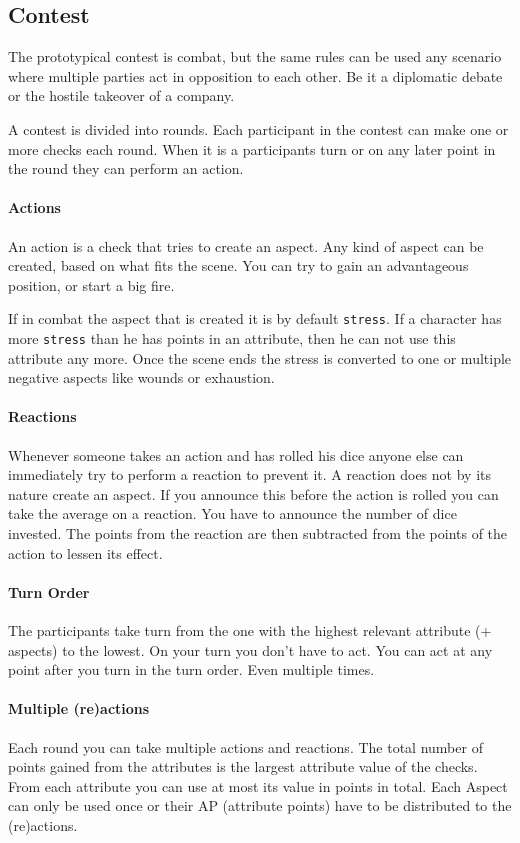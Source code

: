 \documentclass[11pt]{article}
\begin{document}
{\subsection{Contest}
\label{sec:org1925a87}
The prototypical contest is combat, but the same rules can be used any scenario where multiple parties act in opposition to each other. Be it a diplomatic debate or the hostile takeover of a company. 

A contest is divided into rounds. Each participant in the contest can make one or more checks each round. When it is a participants turn or on any later point in the round they can perform an action.

\paragraph*{Actions}
\label{sec:orgf84fa0a}
An action is a check that tries to create an aspect. Any kind of aspect can be created, based on what fits the scene. You can try to gain an advantageous position, or start a big fire.

If in combat the aspect that is created it is by default \texttt{stress}. If a character has more \texttt{stress} than he has points in an attribute, then  he can not use this attribute any more. Once the scene ends the stress is converted to one or multiple negative aspects like wounds or exhaustion. 

\paragraph*{Reactions}
\label{sec:org823c367}
Whenever someone takes an action and has rolled his dice anyone else can immediately try to perform a reaction to prevent it. A reaction does not by its nature create an aspect. If you announce this before the action is rolled you can take the average on a reaction. You have to announce the number of dice invested. The points from the reaction are then subtracted from the points of the action to lessen its effect.

\paragraph*{Turn Order}
\label{sec:orgc3bf1a9}
The participants take turn from the one with the highest relevant attribute (+ aspects) to the lowest. On your turn you don't have to act. You can act at any point after you turn in the turn order. Even multiple times. 

\paragraph*{Multiple (re)actions}
\label{sec:orgbc8a6c3}
Each round you can take multiple actions and reactions. The total number of points gained from the attributes is the largest attribute value of the checks. From each attribute you can use at most its value in points in total. Each Aspect can only be used once or their AP (attribute points) have to be distributed to the (re)actions.

}
\end{document}
